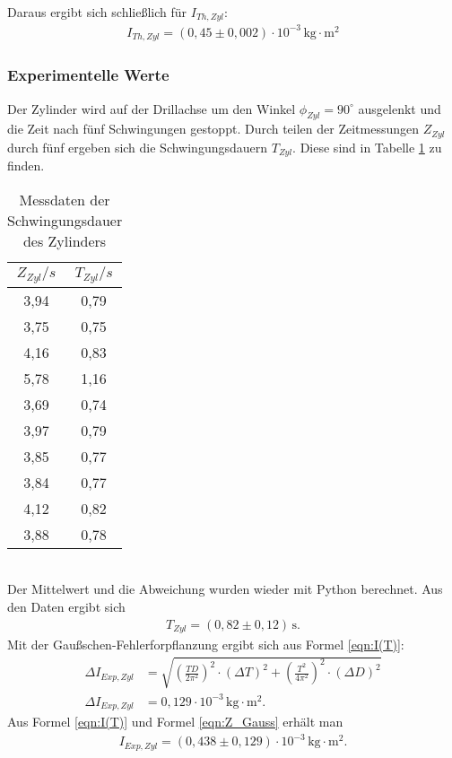 Daraus ergibt sich schließlich für $I_{Th, Zyl}$:
\begin{align*}
  I_{Th, Zyl} = \left(0{,}45 \pm 0{,}002 \right) \cdot 10^{-3} \, \mathrm{kg}\cdot\mathrm{m^2}
\end{align*}

\subsubsection{Experimentelle Werte}
Der Zylinder wird auf der Drillachse um den Winkel $\phi_{Zyl} = 90^{\circ}$ ausgelenkt und die Zeit
nach fünf Schwingungen gestoppt.
Durch teilen der Zeitmessungen $Z_{Zyl}$ durch fünf ergeben sich die Schwingungsdauern $T_{Zyl}$. 
Diese sind in Tabelle \ref{tab:T_Zyl} zu finden.
\begin{table}
  \centering
  \caption{Messdaten der Schwingungsdauer des Zylinders}
  \label{tab:T_Zyl}
  \begin{tabular}{c c}
    \toprule
    $Z_{Zyl}/s$ & $T_{Zyl}/s$ \\
    \midrule
    3,94 & 0,79 \\
    3,75 & 0,75 \\
    4,16 & 0,83 \\
    5,78 & 1,16 \\
    3,69 & 0,74 \\
    3,97 & 0,79 \\
    3,85 & 0,77 \\
    3,84 & 0,77 \\
    4,12 & 0,82 \\
    3,88 & 0,78 \\
    \bottomrule
  \end{tabular}
\end{table}
\\
Der Mittelwert und die Abweichung wurden wieder mit Python berechnet.
Aus den Daten ergibt sich
\begin{align*}
  T_{Zyl} = (0{,}82 \pm 0{,}12)\, \mathrm{s} .
\end{align*}
Mit der Gaußschen-Fehlerforpflanzung ergibt sich aus Formel \ref{eqn:I(T)}:
\begin{align}
  \label{eqn:Z_Gauss}
  \Delta I_{Exp, Zyl} &= \sqrt{\left(\frac{TD}{2\pi^2}\right)^2 \cdot (\Delta T)^2 + \left(\frac{T^2}{4\pi^2} \right)^2 \cdot (\Delta D)^2}  \\
  \Delta I_{Exp, Zyl} &= 0{,}129 \cdot 10^{-3} \, \mathrm{kg \cdot m^2}.
\end{align}
Aus Formel \ref{eqn:I(T)} und Formel \ref{eqn:Z_Gauss} erhält man
\begin{align*}
  I_{Exp, Zyl} = (0{,}438 \pm 0{,}129)\cdot 10^{-3}\, \mathrm{kg \cdot m^2}.
\end{align*}

